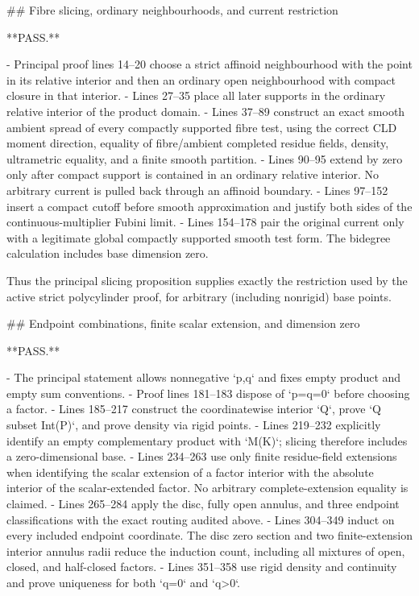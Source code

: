 ## Fibre slicing, ordinary neighbourhoods, and current restriction

**PASS.**

- Principal proof lines 14--20 choose a strict affinoid neighbourhood with the
  point in its relative interior and then an ordinary open neighbourhood with
  compact closure in that interior.
- Lines 27--35 place all later supports in the ordinary relative interior of
  the product domain.
- Lines 37--89 construct an exact smooth ambient spread of every compactly
  supported fibre test, using the correct CLD moment direction, equality of
  fibre/ambient completed residue fields, density, ultrametric equality, and a
  finite smooth partition.
- Lines 90--95 extend by zero only after compact support is contained in an
  ordinary relative interior.  No arbitrary current is pulled back through an
  affinoid boundary.
- Lines 97--152 insert a compact cutoff before smooth approximation and justify
  both sides of the continuous-multiplier Fubini limit.
- Lines 154--178 pair the original current only with a legitimate global
  compactly supported smooth test form.  The bidegree calculation includes
  base dimension zero.

Thus the principal slicing proposition supplies exactly the restriction used
by the active strict polycylinder proof, for arbitrary (including nonrigid)
base points.

## Endpoint combinations, finite scalar extension, and dimension zero

**PASS.**

- The principal statement allows nonnegative `p,q` and fixes empty product and
  empty sum conventions.
- Proof lines 181--183 dispose of `p=q=0` before choosing a factor.
- Lines 185--217 construct the coordinatewise interior `Q`, prove
  `Q subset Int(P)`, and prove density via rigid points.
- Lines 219--232 explicitly identify an empty complementary product with
  `M(K)`; slicing therefore includes a zero-dimensional base.
- Lines 234--263 use only finite residue-field extensions when identifying the
  scalar extension of a factor interior with the absolute interior of the
  scalar-extended factor.  No arbitrary complete-extension equality is
  claimed.
- Lines 265--284 apply the disc, fully open annulus, and three endpoint
  classifications with the exact routing audited above.
- Lines 304--349 induct on every included endpoint coordinate.  The disc zero
  section and two finite-extension interior annulus radii reduce the induction
  count, including all mixtures of open, closed, and half-closed factors.
- Lines 351--358 use rigid density and continuity and prove uniqueness for both
  `q=0` and `q>0`.

